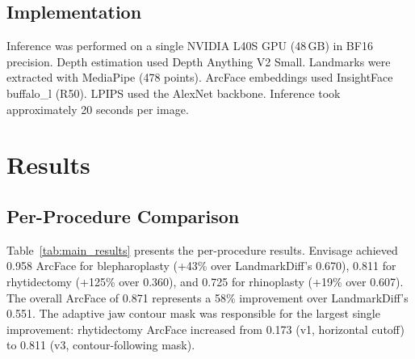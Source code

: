 \documentclass[twocolumn]{article}
\newcommand{\method}{Envisage}
\begin{document}
\subsection{Implementation}

Inference was performed on a single NVIDIA L40S GPU (48\,GB) in BF16
precision. Depth estimation used Depth Anything V2 Small. Landmarks were
extracted with MediaPipe (478 points). ArcFace embeddings used InsightFace
buffalo\_l (R50). LPIPS used the AlexNet backbone. Inference took
approximately 20 seconds per image.

\section{Results}
\label{sec:results}

\subsection{Per-Procedure Comparison}

Table~\ref{tab:main_results} presents the per-procedure results.
\method{} achieved 0.958 ArcFace for blepharoplasty (+43\% over
LandmarkDiff's 0.670), 0.811 for rhytidectomy (+125\% over 0.360), and
0.725 for rhinoplasty (+19\% over 0.607). The overall ArcFace of 0.871
represents a 58\% improvement over LandmarkDiff's 0.551. The adaptive
jaw contour mask was responsible for the largest single improvement:
rhytidectomy ArcFace increased from 0.173 (v1, horizontal cutoff) to
0.811 (v3, contour-following mask).
\end{document}
